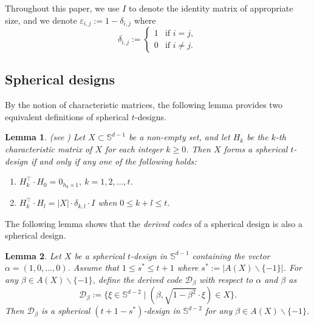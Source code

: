 \documentclass[11pt]{article}
\newtheorem{lemma}{Lemma}[section]
\theoremstyle{definition}
\theoremstyle{remark}
\begin{document}
Throughout this paper, we use $I$ to denote the identity matrix of appropriate size, and we denote $\varepsilon_{i,j}:=1-\delta_{i,j}$ where
\begin{equation*}
\delta_{i,j}:=\begin{cases}
1 & \text{if $i=j$},\\
0 & \text{if $i\neq j$}.	
\end{cases}
\end{equation*}
 

\subsection{Spherical designs}

By the notion of characteristic matrices, the following lemma provides two equivalent definitions of spherical $t$-designs.

\begin{lemma}{\rm (see \cite[Theorem 5.3]{DGS77})}
Let $X\subset\mathbb{S}^{d-1}$ be a non-empty set, and let $H_k$ be the $k$-th characteristic matrix of $X$ for each integer $k\geq 0$.
Then $X$ forms a spherical $t$-design if and only if any one of  the following holds:
\begin{enumerate}[{\rm (i)}]
\item $  {H}_k^\top\cdot   {H}_0=  {0}_{h_k\times 1},\ k=1,2,\ldots,t$.

\item $  {H}_k^\top \cdot   {H}_l=|X|\cdot \delta_{k,l}\cdot    {I}$ when $0\leq k+l\leq t$.

\end{enumerate}
\end{lemma}


The following lemma shows that the {\it derived codes} of a spherical design is also a spherical design.

\begin{lemma}{\rm \cite[Theorem 8.2]{DGS77}}\label{thm:derived-DGS}
Let $X$ be a spherical $t$-design in $\mathbb{S}^{d-1}$ containing the vector $\alpha=(1,0,\ldots,0)$. Assume that $1\leq s^*\leq t+1$ where $s^*:=|A(X)\backslash\{-1\}|$. For any $\beta\in A(X)\backslash\{-1\}$, define the derived code $\mathcal{D}_{\beta}$ with respect to $\alpha$ and $\beta$ as
\begin{equation*}
\mathcal{D}_{\beta}:=\Big\{\xi\in \mathbb{S}^{d-2} \mid (\beta,\sqrt{1-\beta^2}\cdot \xi)\in X\Big\}.
\end{equation*}
Then $\mathcal{D}_{\beta}$ is a spherical $(t+1-s^*)$-design in $\mathbb{S}^{d-2}$ for any $\beta\in A(X)\backslash\{-1\}$.
\end{lemma}
\end{document}
